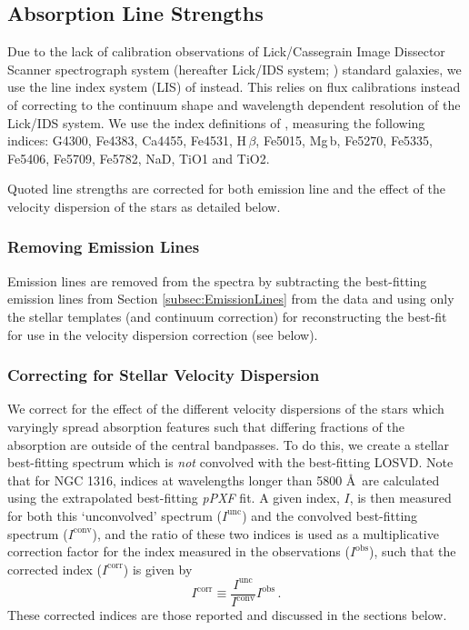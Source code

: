 \documentclass[a4paper,fleqn,usenatbib]{mnras}
\begin{document}
	\subsection{Absorption Line Strengths}
		\label{subsec:absorption}
		Due to the lack of calibration observations of Lick/Cassegrain Image Dissector Scanner spectrograph system (hereafter Lick/IDS system; \citealt{Faber1985, Worthey1994}) standard galaxies, we use the line index system (LIS) of \citet{Vazdekis2010} instead. This relies on flux calibrations instead of correcting to the continuum shape and wavelength dependent resolution of the Lick/IDS system. We use the index definitions of \citet{Trager1998}, measuring the following indices: G4300, Fe4383, Ca4455, Fe4531, H\,$\beta$, Fe5015, Mg\,b, Fe5270, Fe5335, Fe5406, Fe5709, Fe5782, NaD, TiO1 and TiO2. %

		Quoted line strengths are corrected for both emission line and the effect of the velocity dispersion of the stars as detailed below.

		\subsubsection{Removing Emission Lines}
			Emission lines are removed from the spectra by subtracting the best-fitting emission lines from Section \ref{subsec:EmissionLines} from the data and using only the stellar templates (and continuum correction) for reconstructing the best-fit for use in the velocity dispersion correction (see below).

		\subsubsection{Correcting for Stellar Velocity Dispersion}
			\label{subsubsec:EmissionFit}
			We correct for the effect of the different velocity dispersions of the stars which varyingly spread absorption features such that differing fractions of the absorption are outside of the central bandpasses. To do this, we create a stellar best-fitting spectrum which is \textit{not} convolved with the best-fitting LOSVD. Note that for NGC 1316, indices at wavelengths longer than 5800 \AA\ are calculated using the extrapolated best-fitting \textit{pPXF} fit. A given index, $I$, is then measured for both this `unconvolved' spectrum ($I^\text{unc}$) and the convolved best-fitting spectrum ($I^\text{conv}$), and the ratio of these two indices is used as a multiplicative correction factor for the index measured in the observations ($I^\text{obs}$), such that the corrected index ($I^\text{corr}$) is given by
			\begin{equation}
				I^\text{corr} \equiv \frac{I^\text{unc}}{I^\text{conv}} I^\text{obs} \, .
			\end{equation}
			These corrected indices are those reported and discussed in the sections below.
\end{document}
